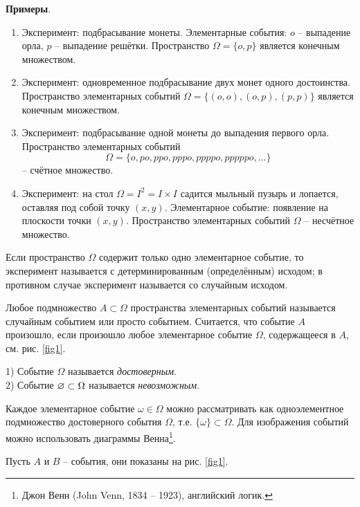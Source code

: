 \textbf{Примеры}. 
\begin{enumerate}
	\item Эксперимент: подбрасывание монеты. Элементарные события: $o$ -- выпадение орла, $p$ -- выпадение решётки. Пространство $\Omega=\{o,p\}$ является конечным множеством.
	\item Эксперимент: одновременное подбрасывание двух монет одного достоинства. Пространство элементарных событий $\Omega=\{(o,o),(o,p),(p,p)\}$ является конечным множеством.
	\item Эксперимент: подбрасывание одной монеты до выпадения первого орла. Пространство элементарных событий $$\Omega=\{o, po, ppo, pppo, ppppo, pppppo, \ldots\}$$ -- счётное множество.
	\item Эксперимент: на стол $\Omega=I^2=I\times I$ садится мыльный пузырь и лопается, оставляя под собой точку $(x, y)$. Элементарное событие: появление на плоскости точки $(x, y)$. Пространство элементарных событий $\Omega$ -- несчётное
множество.
\end{enumerate}


\begin{definition}
	\label{def:2.3}
Если пространство $\Omega$ содержит только одно элементарное событие, то эксперимент называется с детерминированным (определённым) исходом; в противном случае эксперимент называется со случайным исходом.
\end{definition}

\begin{definition} 
	\label{def:2.4}
Любое подмножество $A\subset\Omega$ пространства элементарных событий называется случайным событием или просто событием. Считается, что событие $A$ произошло, если произошло любое элементарное событие $\Omega$, содержащееся в $A$, см. рис. \ref{fig1}.
\end{definition}

\begin{definition}
	\label{def:2.5}
	1) Событие $\Omega$ называется \textit{достоверным}.\\
	2) Событие $\varnothing\subset\Omega$ называется \textit{невозможным}.
\end{definition}

Каждое элементарное событие $\omega\in\Omega$ можно рассматривать как одноэлементное подмножество достоверного события $\Omega$, т.е. $\{\omega\}\subset\Omega$. Для изображения событий можно использовать диаграммы Венна\footnote{Джон Венн (John Venn, 1834 -- 1923), английский логик.}.

Пусть $A$ и $B$ -- события, они показаны на рис. \ref{fig1}.

